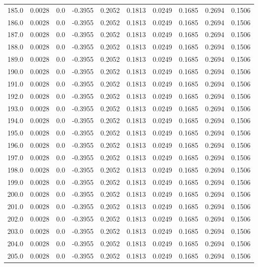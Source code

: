 \begin{longtable}{lrrrrrrrrr}
185.0 & 0.0028 & 0.0 & -0.3955 & 0.2052 & 0.1813 & 0.0249 & 0.1685 & 0.2694 & 0.1506 \\
186.0 & 0.0028 & 0.0 & -0.3955 & 0.2052 & 0.1813 & 0.0249 & 0.1685 & 0.2694 & 0.1506 \\
187.0 & 0.0028 & 0.0 & -0.3955 & 0.2052 & 0.1813 & 0.0249 & 0.1685 & 0.2694 & 0.1506 \\
188.0 & 0.0028 & 0.0 & -0.3955 & 0.2052 & 0.1813 & 0.0249 & 0.1685 & 0.2694 & 0.1506 \\
189.0 & 0.0028 & 0.0 & -0.3955 & 0.2052 & 0.1813 & 0.0249 & 0.1685 & 0.2694 & 0.1506 \\
190.0 & 0.0028 & 0.0 & -0.3955 & 0.2052 & 0.1813 & 0.0249 & 0.1685 & 0.2694 & 0.1506 \\
191.0 & 0.0028 & 0.0 & -0.3955 & 0.2052 & 0.1813 & 0.0249 & 0.1685 & 0.2694 & 0.1506 \\
192.0 & 0.0028 & 0.0 & -0.3955 & 0.2052 & 0.1813 & 0.0249 & 0.1685 & 0.2694 & 0.1506 \\
193.0 & 0.0028 & 0.0 & -0.3955 & 0.2052 & 0.1813 & 0.0249 & 0.1685 & 0.2694 & 0.1506 \\
194.0 & 0.0028 & 0.0 & -0.3955 & 0.2052 & 0.1813 & 0.0249 & 0.1685 & 0.2694 & 0.1506 \\
195.0 & 0.0028 & 0.0 & -0.3955 & 0.2052 & 0.1813 & 0.0249 & 0.1685 & 0.2694 & 0.1506 \\
196.0 & 0.0028 & 0.0 & -0.3955 & 0.2052 & 0.1813 & 0.0249 & 0.1685 & 0.2694 & 0.1506 \\
197.0 & 0.0028 & 0.0 & -0.3955 & 0.2052 & 0.1813 & 0.0249 & 0.1685 & 0.2694 & 0.1506 \\
198.0 & 0.0028 & 0.0 & -0.3955 & 0.2052 & 0.1813 & 0.0249 & 0.1685 & 0.2694 & 0.1506 \\
199.0 & 0.0028 & 0.0 & -0.3955 & 0.2052 & 0.1813 & 0.0249 & 0.1685 & 0.2694 & 0.1506 \\
200.0 & 0.0028 & 0.0 & -0.3955 & 0.2052 & 0.1813 & 0.0249 & 0.1685 & 0.2694 & 0.1506 \\
201.0 & 0.0028 & 0.0 & -0.3955 & 0.2052 & 0.1813 & 0.0249 & 0.1685 & 0.2694 & 0.1506 \\
202.0 & 0.0028 & 0.0 & -0.3955 & 0.2052 & 0.1813 & 0.0249 & 0.1685 & 0.2694 & 0.1506 \\
203.0 & 0.0028 & 0.0 & -0.3955 & 0.2052 & 0.1813 & 0.0249 & 0.1685 & 0.2694 & 0.1506 \\
204.0 & 0.0028 & 0.0 & -0.3955 & 0.2052 & 0.1813 & 0.0249 & 0.1685 & 0.2694 & 0.1506 \\
205.0 & 0.0028 & 0.0 & -0.3955 & 0.2052 & 0.1813 & 0.0249 & 0.1685 & 0.2694 & 0.1506 \\

\end{longtable}
